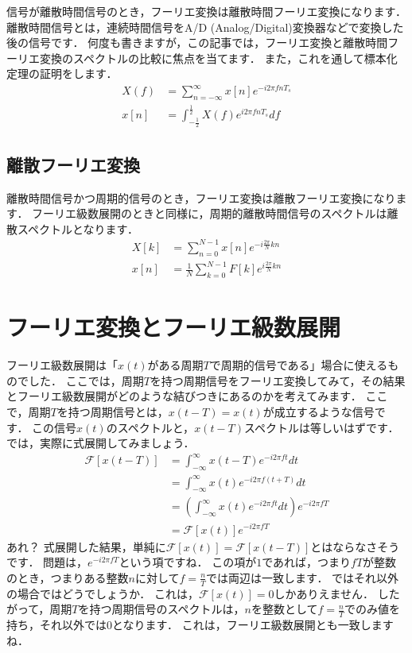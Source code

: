 信号が離散時間信号のとき，フーリエ変換は離散時間フーリエ変換になります．
離散時間信号とは，連続時間信号をA/D (Analog/Digital)変換器などで変換した後の信号です．
何度も書きますが，この記事では，フーリエ変換と離散時間フーリエ変換のスペクトルの比較に焦点を当てます．
また，これを通して標本化定理の証明をします．
\begin{align}
X(f) &= \sum_{n=-\infty}^{\infty} x[n] e^{-i 2 \pi fnT_s} \\
x[n] &= \int_{-\frac{1}{2}}^{\frac{1}{2}} X(f)e^{i2\pi fnT_s} df
\end{align}


\subsection{離散フーリエ変換}

離散時間信号かつ周期的信号のとき，フーリエ変換は離散フーリエ変換になります．
フーリエ級数展開のときと同様に，周期的離散時間信号のスペクトルは離散スペクトルとなります．
\begin{align}
X[k] &= \sum_{n=0}^{N-1} x[n] e^{-i \frac{2\pi}{N} kn} \\
x[n] &= \frac{1}{N} \sum_{k=0}^{N-1} F[k] e^{i \frac{2\pi}{N} kn}
\end{align}


\section{フーリエ変換とフーリエ級数展開}

フーリエ級数展開は「$x(t)$がある周期$T$で周期的信号である」場合に使えるものでした．
ここでは，周期$T$を持つ周期信号をフーリエ変換してみて，その結果とフーリエ級数展開がどのような結びつきにあるのかを考えてみます．
ここで，周期$T$を持つ周期信号とは，$x(t - T) = x(t)$が成立するような信号です．
この信号$x(t)$のスペクトルと，$x(t - T)$スペクトルは等しいはずです．
では，実際に式展開してみましょう．
\begin{align}
\mathcal{F}[x(t-T)]     &= \int_{-\infty}^{\infty} x(t-T) e^{-i2\pi f t} dt \nonumber\\
                        &= \int_{-\infty}^{\infty} x(t) e^{-i2\pi f(t + T)} dt  \nonumber\\
                        &= \left(\int_{-\infty}^{\infty} x(t) e^{-i2\pi ft} dt \right) e^{-i2\pi fT}  \nonumber\\
                        &= \mathcal{F}[x(t)] e^{-i2\pi fT}
\end{align}
あれ？
式展開した結果，単純に$\mathcal{F}[x(t)] = \mathcal{F}[x(t-T)]$とはならなさそうです．
問題は，$e^{-i2\pi fT}$という項ですね．
この項が$1$であれば，つまり$fT$が整数のとき，つまりある整数$n$に対して$f=\frac{n}{T}$では両辺は一致します．
ではそれ以外の場合ではどうでしょうか．
これは，$\mathcal{F}[x(t)]=0$しかありえません．
したがって，周期$T$を持つ周期信号のスペクトルは，$n$を整数として$f=\frac{n}{T}$でのみ値を持ち，それ以外では$0$となります．
これは，フーリエ級数展開とも一致しますね．

